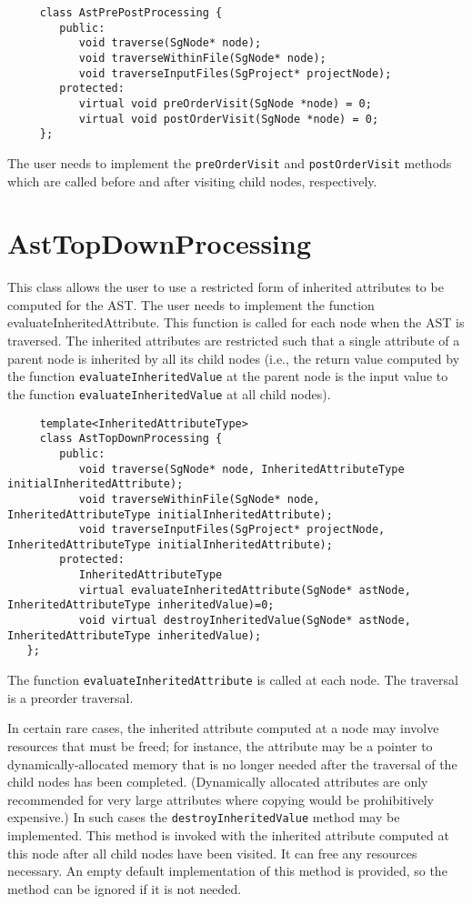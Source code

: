 {\indent
{\mySmallFontSize
\begin{verbatim}
     class AstPrePostProcessing {
        public:
           void traverse(SgNode* node);
           void traverseWithinFile(SgNode* node);
           void traverseInputFiles(SgProject* projectNode);
        protected:
           virtual void preOrderVisit(SgNode *node) = 0;
           virtual void postOrderVisit(SgNode *node) = 0;
     };
\end{verbatim}
}}

The user needs to implement the {\tt preOrderVisit} and {\tt postOrderVisit}
methods which are called before and after visiting child nodes, respectively.

\section{AstTopDownProcessing}
\label{AstProcessing:AstTopDownProcessing}

This class allows the user to use a restricted form of inherited attributes to
be computed for the AST. The user needs to implement the function
evaluateInheritedAttribute. This function is called for each node when
the AST is traversed. The inherited attributes are restricted such
that a single attribute of a parent node is inherited by all its child
nodes (i.e., the return value computed by the function {\tt evaluateInheritedValue} 
at the parent node is the input value to the function {\tt evaluateInheritedValue} 
at all child nodes).

{\indent
{\mySmallFontSize
\begin{verbatim}
     template<InheritedAttributeType>
     class AstTopDownProcessing {
        public:
           void traverse(SgNode* node, InheritedAttributeType initialInheritedAttribute);
           void traverseWithinFile(SgNode* node, InheritedAttributeType initialInheritedAttribute);
           void traverseInputFiles(SgProject* projectNode, InheritedAttributeType initialInheritedAttribute);
        protected:
           InheritedAttributeType 
           virtual evaluateInheritedAttribute(SgNode* astNode, InheritedAttributeType inheritedValue)=0;
           void virtual destroyInheritedValue(SgNode* astNode, InheritedAttributeType inheritedValue);
   };
\end{verbatim}
}}

The function {\tt evaluateInheritedAttribute} is called at each node. The traversal is a preorder traversal.

In certain rare cases, the inherited attribute computed at a node may involve
resources that must be freed; for instance, the attribute may be a pointer to
dynamically-allocated memory that is no longer needed after the traversal of
the child nodes has been completed. (Dynamically allocated attributes are only
recommended for very large attributes where copying would be prohibitively
expensive.) In such cases the {\tt destroyInheritedValue} method may be
implemented. This method is invoked with the inherited attribute computed at
this node after all child nodes have been visited. It can free any resources
necessary. An empty default implementation of this method is provided, so the
method can be ignored if it is not needed.

